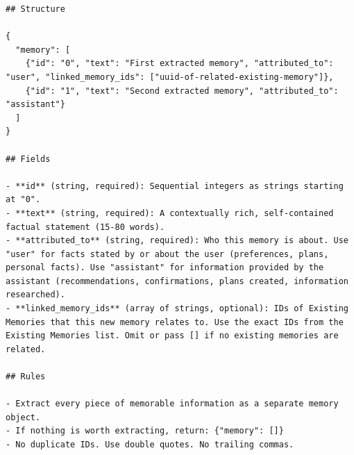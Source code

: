 \documentclass[11pt]{article}
\begin{document}
\begin{lstlisting}
## Structure

{
  "memory": [
    {"id": "0", "text": "First extracted memory", "attributed_to": "user", "linked_memory_ids": ["uuid-of-related-existing-memory"]},
    {"id": "1", "text": "Second extracted memory", "attributed_to": "assistant"}
  ]
}

## Fields

- **id** (string, required): Sequential integers as strings starting at "0".
- **text** (string, required): A contextually rich, self-contained factual statement (15-80 words).
- **attributed_to** (string, required): Who this memory is about. Use "user" for facts stated by or about the user (preferences, plans, personal facts). Use "assistant" for information provided by the assistant (recommendations, confirmations, plans created, information researched).
- **linked_memory_ids** (array of strings, optional): IDs of Existing Memories that this new memory relates to. Use the exact IDs from the Existing Memories list. Omit or pass [] if no existing memories are related.

## Rules

- Extract every piece of memorable information as a separate memory object.
- If nothing is worth extracting, return: {"memory": []}
- No duplicate IDs. Use double quotes. No trailing commas.
\end{lstlisting}
\end{document}
